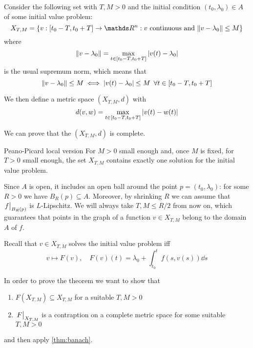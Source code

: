 \documentclass[12pt]{extarticle}
\numberwithin{equation}{section}
\begin{document}
Consider the following set with $T, M > 0$
and the initial condition $(t_0, \lambda_0) \in A$ of some initial value problem:
\begin{equation}
	X_{T, M} = \{ v: [t_0 - T, t_0 + T] \to \R^n : v \text{ continuous and } \norm{v-\lambda_0} \leq M \}
\end{equation}
where
\begin{equation}
	\norm{v-\lambda_0} = \max_{t \in [t_0 - T, t_0 + T]} \abs{v(t) - \lambda_0}
\end{equation}
is the usual supremum norm, which means that
\begin{equation}
	\norm{v - \lambda_0} \leq M \iff \abs{v(t) - \lambda_0} \leq M \enspace \forall t \in [t_0 - T, t_0 + T]
\end{equation}

We then define a metric space $(X_{T, M}, d)$ with
\begin{equation}
	d(v, w) = \max_{t \in [t_0 - T, t_0 + T]} \abs{v(t) - w(t)}
\end{equation}

We can prove that the $(X_{T,M}, d)$ is complete.

\begin{theorem}{Peano-Picard local version}{}
	For $M > 0$ small enough and, once $M$ is fixed, for $T>0$ small enough, the set $X_{T, M}$ contains exactly one solution
	for the initial value problem.
\end{theorem}

Since $A$ is open, it includes an open ball around the point $p = (t_0, \lambda_0)$:
for some $R > 0$ we have $B_R(p) \subseteq A$.
Moreover, by shrinking $R$ we can assume that $\eval{f}_{B_R(p)}$ is $L$-Lipschitz.
We will always take $T, M \leq R/2$ from now on, which guarantees that points in the graph of a function $v \in X_{T, M}$ belong to the domain $A$ of $f$.

Recall that $v \in X_{T, M}$ solves the initial value problem iff
\begin{equation}
	v \mapsto F(v), \quad F(v)(t) = \lambda_0 + \int^t_{t_0} f(s, v(s)) \dd s
\end{equation}

In order to prove the theorem we want to show that
\begin{enumerate}
	\item $F(X_{T, M}) \subseteq X_{T, M}$ for a suitable $T, M >0$
	\item $\eval{F}_{X_{T, M}}$ is a contraption on a complete metric space for some suitable $T, M > 0$
\end{enumerate}
and then apply \cref{thm:banach}.
\end{document}
